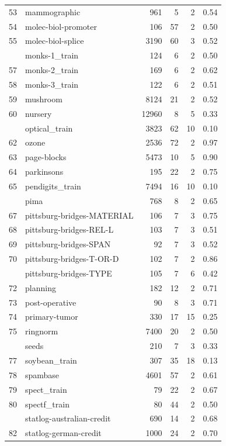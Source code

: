 \documentclass[]{elsarticle} %
\begin{document}
\begin{longtable}[t]{rlrrrr}
53 & mammographic & 961 & 5 & 2 & 0.54\\
54 & molec-biol-promoter & 106 & 57 & 2 & 0.50\\
55 & molec-biol-splice & 3190 & 60 & 3 & 0.52\\
\addlinespace
56 & monks-1\_train & 124 & 6 & 2 & 0.50\\
57 & monks-2\_train & 169 & 6 & 2 & 0.62\\
58 & monks-3\_train & 122 & 6 & 2 & 0.51\\
59 & mushroom & 8124 & 21 & 2 & 0.52\\
60 & nursery & 12960 & 8 & 5 & 0.33\\
\addlinespace
61 & optical\_train & 3823 & 62 & 10 & 0.10\\
62 & ozone & 2536 & 72 & 2 & 0.97\\
63 & page-blocks & 5473 & 10 & 5 & 0.90\\
64 & parkinsons & 195 & 22 & 2 & 0.75\\
65 & pendigits\_train & 7494 & 16 & 10 & 0.10\\
\addlinespace
66 & pima & 768 & 8 & 2 & 0.65\\
67 & pittsburg-bridges-MATERIAL & 106 & 7 & 3 & 0.75\\
68 & pittsburg-bridges-REL-L & 103 & 7 & 3 & 0.51\\
69 & pittsburg-bridges-SPAN & 92 & 7 & 3 & 0.52\\
70 & pittsburg-bridges-T-OR-D & 102 & 7 & 2 & 0.86\\
\addlinespace
71 & pittsburg-bridges-TYPE & 105 & 7 & 6 & 0.42\\
72 & planning & 182 & 12 & 2 & 0.71\\
73 & post-operative & 90 & 8 & 3 & 0.71\\
74 & primary-tumor & 330 & 17 & 15 & 0.25\\
75 & ringnorm & 7400 & 20 & 2 & 0.50\\
\addlinespace
76 & seeds & 210 & 7 & 3 & 0.33\\
77 & soybean\_train & 307 & 35 & 18 & 0.13\\
78 & spambase & 4601 & 57 & 2 & 0.61\\
79 & spect\_train & 79 & 22 & 2 & 0.67\\
80 & spectf\_train & 80 & 44 & 2 & 0.50\\
\addlinespace
81 & statlog-australian-credit & 690 & 14 & 2 & 0.68\\
82 & statlog-german-credit & 1000 & 24 & 2 & 0.70\\

\end{longtable}
\end{document}
